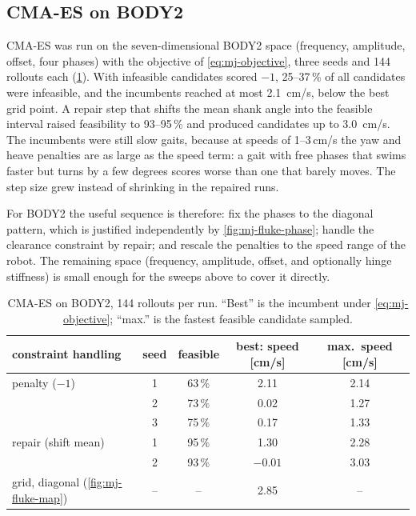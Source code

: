 \subsection{CMA-ES on BODY2}
CMA-ES was run on the seven-dimensional BODY2 space (frequency, amplitude, offset, four
phases) with the objective of \cref{eq:mj-objective}, three seeds and 144 rollouts each
(\cref{tab:mj-fluke-cma}). With infeasible candidates scored $-1$, 25--37\,\% of all
candidates were infeasible, and the incumbents reached at most \SI{2.1}{cm/s}, below the
best grid point. A repair step that shifts the mean shank angle into the feasible
interval raised feasibility to 93--95\,\% and produced candidates up to \SI{3.0}{cm/s}.
The incumbents were still slow gaits, because at speeds of 1--3\,cm/s the yaw and heave
penalties are as large as the speed term: a gait with free phases that swims faster but
turns by a few degrees scores worse than one that barely moves. The step size grew
instead of shrinking in the repaired runs.

For BODY2 the useful sequence is therefore: fix the phases to the diagonal pattern,
which is justified independently by \cref{fig:mj-fluke-phase}; handle the clearance
constraint by repair; and rescale the penalties to the speed range of the robot. The
remaining space (frequency, amplitude, offset, and optionally hinge stiffness) is small
enough for the sweeps above to cover it directly.

\begin{table}[t]
\centering
\caption{CMA-ES on BODY2, 144 rollouts per run. ``Best'' is the incumbent under
\cref{eq:mj-objective}; ``max.'' is the fastest feasible candidate sampled.}
\label{tab:mj-fluke-cma}
\small
\begin{tabular}{@{}lcccc@{}}
\toprule
constraint handling & seed & feasible & best: speed [cm/s] & max.\ speed [cm/s] \\
\midrule
penalty ($-1$)      & 1 & 63\,\% & 2.11 & 2.14 \\
                    & 2 & 73\,\% & 0.02 & 1.27 \\
                    & 3 & 75\,\% & 0.17 & 1.33 \\
repair (shift mean) & 1 & 95\,\% & 1.30 & 2.28 \\
                    & 2 & 93\,\% & $-0.01$ & 3.03 \\
\midrule
grid, diagonal (\cref{fig:mj-fluke-map}) & -- & -- & 2.85 & -- \\
\bottomrule
\end{tabular}
\end{table}

